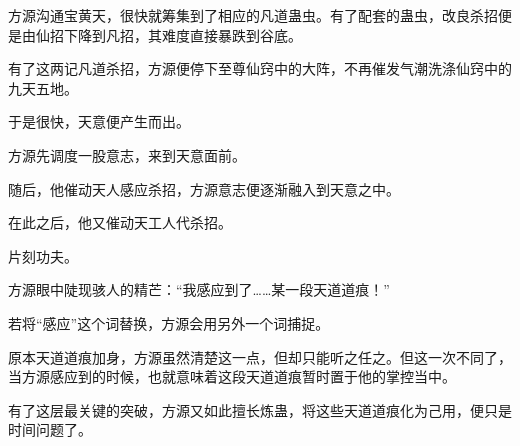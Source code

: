 \begin{this_body}
方源沟通宝黄天，很快就筹集到了相应的凡道蛊虫。有了配套的蛊虫，改良杀招便是由仙招下降到凡招，其难度直接暴跌到谷底。

有了这两记凡道杀招，方源便停下至尊仙窍中的大阵，不再催发气潮洗涤仙窍中的九天五地。

于是很快，天意便产生而出。

方源先调度一股意志，来到天意面前。

随后，他催动天人感应杀招，方源意志便逐渐融入到天意之中。

在此之后，他又催动天工人代杀招。

片刻功夫。

方源眼中陡现骇人的精芒：“我感应到了……某一段天道道痕！”

若将“感应”这个词替换，方源会用另外一个词捕捉。

原本天道道痕加身，方源虽然清楚这一点，但却只能听之任之。但这一次不同了，当方源感应到的时候，也就意味着这段天道道痕暂时置于他的掌控当中。

有了这层最关键的突破，方源又如此擅长炼蛊，将这些天道道痕化为己用，便只是时间问题了。

\end{this_body}

